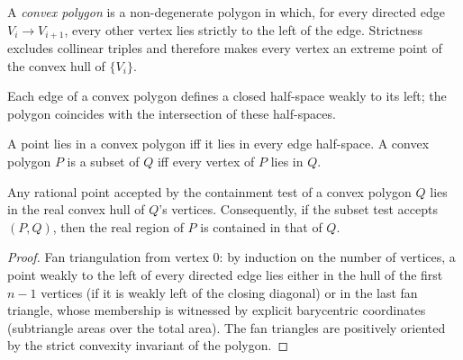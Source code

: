 \begin{definition}
  \label{def:convex-polygon}
  \leanok
  A \emph{convex polygon} is a non-degenerate polygon in which, for every
  directed edge $V_i \to V_{i+1}$, every other vertex lies strictly to the
  left of the edge. Strictness excludes collinear triples and therefore
  makes every vertex an extreme point of the convex hull of $\{V_i\}$.
\end{definition}

\begin{definition}
  \label{def:toHalfSpaces}
  \leanok
  Each edge of a convex polygon defines a closed half-space weakly to its
  left; the polygon coincides with the intersection of these half-spaces.
\end{definition}

\begin{definition}
  \label{def:contains}
  \leanok
  A point lies in a convex polygon iff it lies in every edge half-space.
  A convex polygon $P$ is a subset of $Q$ iff every vertex of $P$ lies in
  $Q$.
\end{definition}

\begin{lemma}
  \label{lem:contains-sound}
  \leanok
  Any rational point accepted by the containment test of a convex polygon
  $Q$ lies in the real convex hull of $Q$'s vertices. Consequently, if the
  subset test accepts $(P, Q)$, then the real region of $P$ is contained in
  that of $Q$.
\end{lemma}
\begin{proof}
  \leanok
  Fan triangulation from vertex $0$: by induction on the number of
  vertices, a point weakly to the left of every directed edge lies either
  in the hull of the first $n-1$ vertices (if it is weakly left of the
  closing diagonal) or in the last fan triangle, whose membership is
  witnessed by explicit barycentric coordinates (subtriangle areas over the
  total area). The fan triangles are positively oriented by the strict
  convexity invariant of the polygon.
\end{proof}

